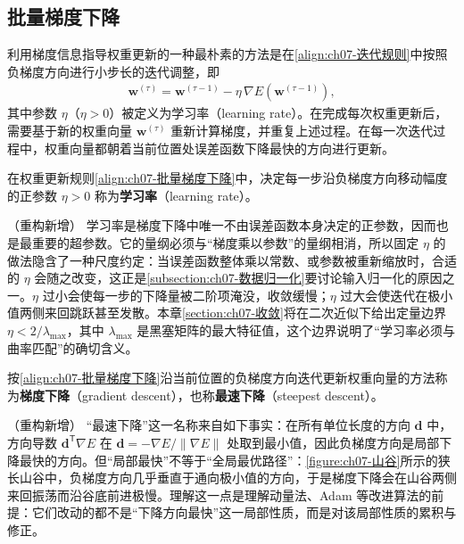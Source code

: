 \documentclass[../../main.tex]{subfiles}
\begin{document}
\subsection{批量梯度下降}\label{subsection:ch07-批量梯度下降}

利用梯度信息指导权重更新的一种最朴素的方法是在\eqref{align:ch07-迭代规则}中按照负梯度方向进行小步长的迭代调整，即
\begin{align}
\mathbf{w}^{(\tau)} = \mathbf{w}^{(\tau-1)}-\eta\,\nabla E(\mathbf{w}^{(\tau-1)}),
\label{align:ch07-批量梯度下降}
\end{align}
其中参数 $\eta$（$\eta>0$）被定义为学习率（learning rate）。在完成每次权重更新后，需要基于新的权重向量 $\mathbf{w}^{(\tau)}$ 重新计算梯度，并重复上述过程。在每一次迭代过程中，权重向量都朝着当前位置处误差函数下降最快的方向进行更新。

\begin{definition}[学习率]\label{definition:ch07-学习率}
在权重更新规则\eqref{align:ch07-批量梯度下降}中，决定每一步沿负梯度方向移动幅度的正参数 $\eta>0$ 称为\textbf{学习率}（learning rate）。
\end{definition}

\begin{remark}（重构新增）
学习率是梯度下降中唯一不由误差函数本身决定的正参数，因而也是最重要的超参数。它的量纲必须与“梯度乘以参数”的量纲相消，所以固定 $\eta$ 的做法隐含了一种尺度约定：当误差函数整体乘以常数、或参数被重新缩放时，合适的 $\eta$ 会随之改变，这正是\cref{subsection:ch07-数据归一化}要讨论输入归一化的原因之一。$\eta$ 过小会使每一步的下降量被二阶项淹没，收敛缓慢；$\eta$ 过大会使迭代在极小值两侧来回跳跃甚至发散。本章\cref{section:ch07-收敛}将在二次近似下给出定量边界 $\eta<2/\lambda_{\max}$，其中 $\lambda_{\max}$ 是黑塞矩阵的最大特征值，这个边界说明了“学习率必须与曲率匹配”的确切含义。
\end{remark}

\begin{definition}[梯度下降与最速下降]\label{definition:ch07-梯度下降}
按\eqref{align:ch07-批量梯度下降}沿当前位置的负梯度方向迭代更新权重向量的方法称为\textbf{梯度下降}（gradient descent），也称\textbf{最速下降}（steepest descent）。
\end{definition}

\begin{remark}（重构新增）
“最速下降”这一名称来自如下事实：在所有单位长度的方向 $\mathbf{d}$ 中，方向导数 $\mathbf{d}^{\mathsf T}\nabla E$ 在 $\mathbf{d}=-\nabla E/\|\nabla E\|$ 处取到最小值，因此负梯度方向是局部下降最快的方向。但“局部最快”不等于“全局最优路径”：\cref{figure:ch07-山谷}所示的狭长山谷中，负梯度方向几乎垂直于通向极小值的方向，于是梯度下降会在山谷两侧来回振荡而沿谷底前进极慢。理解这一点是理解动量法、Adam 等改进算法的前提：它们改动的都不是“下降方向最快”这一局部性质，而是对该局部性质的累积与修正。
\end{remark}
\end{document}
